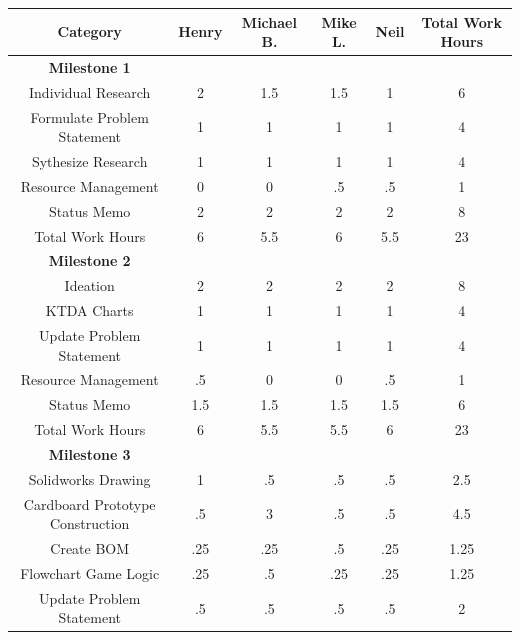 \documentclass[conference]{IEEEtran}
\begin{document}
   \begin{table}[H]
     \centering
     \begin{tabular}{| c | c | c | c | c | c |}
       \hline
       \rowcolor{blue!55} Category & Henry & Michael B. & Mike L. & Neil & Total Work Hours\\
       \hline
       \rowcolor{lightgray} \textbf{Milestone 1} & & & & &\\
       \hline
       \rowcolor{blue!25} Individual Research & 2 & 1.5 & 1.5 & 1 & 6\\
       \hline
       Formulate Problem Statement & 1 & 1 & 1 & 1 & 4\\
       \hline
       \rowcolor{blue!25} Sythesize Research & 1 & 1 & 1 & 1 & 4\\
       \hline
       Resource Management & 0 & 0 & .5 & .5 & 1\\
       \hline
       \rowcolor{blue!25} Status Memo & 2 & 2 & 2 & 2 & 8\\
       \hline
       Total Work Hours & 6 & 5.5 & 6 & 5.5 & 23\\
       \hline
       \rowcolor{lightgray} \textbf{Milestone 2} & & & & &\\
       \hline
       \rowcolor{blue!25} Ideation & 2 & 2 & 2 & 2 & 8\\
       \hline
       KTDA Charts & 1 & 1 & 1 & 1 & 4\\
       \hline
       \rowcolor{blue!25} Update Problem Statement & 1 & 1 & 1 & 1 & 4\\
       \hline
       Resource Management & .5 & 0 & 0 & .5 & 1\\
       \hline
       \rowcolor{blue!25} Status Memo & 1.5 & 1.5 & 1.5 & 1.5 & 6\\
       \hline
       Total Work Hours & 6 & 5.5 & 5.5 & 6 & 23\\
       \hline
       \rowcolor{lightgray} \textbf{Milestone 3} & & & & &\\
       \hline
       \rowcolor{blue!25} Solidworks Drawing & 1 & .5 & .5 & .5 & 2.5\\
       \hline
       Cardboard Prototype Construction & .5 & 3 & .5 & .5 & 4.5\\
       \hline
       \rowcolor{blue!25} Create BOM & .25 & .25 & .5 & .25 & 1.25\\
       \hline
       Flowchart Game Logic & .25 & .5 & .25 & .25 & 1.25\\
       \hline
       \rowcolor{blue!25} Update Problem Statement & .5 & .5 & .5 & .5 & 2\\

\end{tabular}
\end{table}
\end{document}
